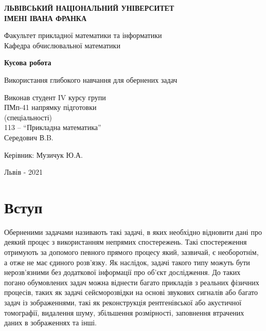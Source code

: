 \documentclass[14pt,a4paper]{extarticle}
\newcounter{e}
\newcounter{tabl}
\numberwithin{equation}{section}
\numberwithin{figure}{section}
\begin{document}
	\begin{titlepage}%
		\begin{center}
			{\textbf{ЛЬВІВСЬКИЙ НАЦІОНАЛЬНИЙ УНІВЕРСИТЕТ \\ ІМЕНІ ІВАНА ФРАНКА}}\par
			{Факультет прикладної математики та інформатики \\ Кафедра обчислювальної математики}\par
			\vspace{40mm}
			{\textbf{\huge{Кусова робота}}}\par
			\vspace{5mm}
			{\large{Використання глибокого навчання для обернених задач}}\par
			\vspace{5mm}\par %
		\end{center}
		
		\vfill
		\vskip80pt
		
		\begin{flushleft}
			\hskip 8cm 
			Виконав студент IV курсу групи
			\\ \hskip8cm
			ПМп-41 напрямку підготовки 
			\\ \hskip8cm
			(спеціальності)
			\\ \hskip8cm
			113 -- ``Прикладна математика''
			\\ \hskip8cm
			Середович В.B.
		\end{flushleft}
		\begin{flushleft}
			\hskip8cm 
			Керівник: Музичук Ю.А.
		\end{flushleft}
		
		\vfill
		
		\begin{center}
			\large
			Львів - 2021
		\end{center}
	\end{titlepage}

	\tableofcontents

	
	\newpage
	\thispagestyle{empty}
	\section*{Вступ}
	Оберненими задачами називають такі задачі, в яких необхідно відновити дані про деякий процес з використанням непрямих спостережень. Такі спостереження отримують за допомого певного прямого процесу який, зазвичай, є необоротнім, а отже не має єдиного розв'язку. Як наслідок, задачі такого типу можуть бути нерозв'язними без додаткової інформації про об'єкт дослідження. До таких погано обумовлених задач можна віднести багато прикладів з реальних фізичних процесів, таких як задачі сейсморозвідки на основі звукових сигналів або багато задач із зображеннями, такі як реконструкція рентгенівської або акустичної томографії, видалення шуму, збільшення розмірності, заповнення втрачених даних в зображеннях та інші. 
	
\end{document}
